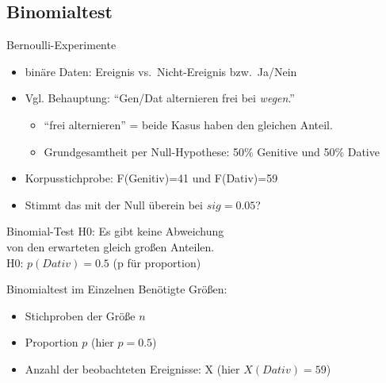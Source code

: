 \subsection{Binomialtest}

\begin{frame}
  {Bernoulli-Experimente}
  \begin{itemize}[<+->]
    \item binäre Daten: Ereignis vs.\ Nicht-Ereignis bzw.\ Ja\slash Nein
      \vspace{0.5cm}
    \item Vgl. Behauptung: "`Gen/Dat alternieren frei bei \textit{wegen}."'
      \begin{itemize}[<+->]
	\item "`frei alternieren"' = beide Kasus haben den gleichen Anteil.
	\item Grundgesamtheit per Null-Hypothese: \alert{50\% Genitive} und \alert{50\% Dative}
      \end{itemize}
      \vspace{0.5cm}
    \item Korpusstichprobe: \alert{F(Genitiv)=41} und \alert{F(Dativ)=59}
    \item Stimmt das mit der Null überein bei $sig=0.05$?
  \end{itemize}
\end{frame}

\begin{frame}
  {Binomial-Test}  
  \pause
  \Large
  H0: Es gibt keine Abweichung\\
  von den erwarteten gleich großen Anteilen.\\[\baselineskip]
  \pause
  \alert{H0: $p(Dativ)=0.5$} (p für proportion)
\end{frame}

\begin{frame}
  {Binomialtest im Einzelnen}
  Benötigte Größen:

  \begin{itemize}[<+->]
    \item Stichproben der Größe \alert{$n$}
    \item Proportion \alert{$p$} (hier $p=0.5$)
    \item Anzahl der beobachteten Ereignisse: \alert{X} (hier $X(Dativ)=59$)
  \end{itemize}
\end{frame}

